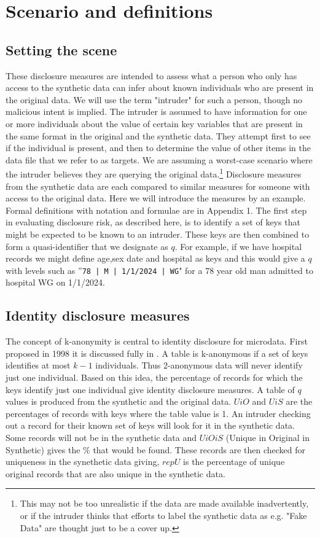 \documentclass[12pt]{article}
\begin{document}
\section{Scenario and definitions}\label{sec:sc_def_not}
\subsection{Setting the scene}\label{subsec:scen}
These disclosure measures are intended to assess what a person who only has access 
to the synthetic data can infer about known individuals who are present in the original data. We will use the term "intruder" for such a person, though no malicious intent is implied. The intruder is assumed to have information for one or more individuals about the value of certain key variables that are present in the same format in the original and the synthetic data. They attempt first to see if the individual is present, and then to determine the value of other items in the data file that we refer to as targets. We are assuming a worst-case scenario where the intruder believes 
they are querying the original data.\footnote{This may not be too unrealistic if the data are made available inadvertently, or if the intruder thinks that efforts to label the synthetic data as e.g. "Fake Data" are thought just to be a cover up.}
Disclosure measures from the synthetic data are each compared to similar measures for someone with access to the original data. Here we will introduce the measures by an example. Formal definitions with notation and formulae are in Appendix 1.
The first step in evaluating disclosure risk, as described here, is to identify a set of keys that might be expected to be known to an intruder. These keys are then combined to form a quasi-identifier that we designate as $q$. For example, if we have hospital records we might define age,sex date and hospital as keys and this would give a $q$ with levels such as ''\texttt{78 | M | 1/1/2024 | WG}" for a 78 year old man admitted to hospital WG on 1/1/2024.

\subsection{Identity disclosure measures}\label{subsec:ident} 
The concept of k-anonymity is central to identity disclosure for microdata. First proposed in 1998 \cite{kanon1} it is discussed fully in \cite{elliot_anonframe}. A table is k-anonymous if a set of keys identifies at most $k-1$ individuals. Thus 2-anonymous data will never identify just one individual. Based on this idea, the percentage of records for which the keys identify just one individual give identity disclosure measures. 
 A table of $q$ values is produced from the synthetic and the original data. $UiO$ and $UiS$ are the percentages of records with keys where the table value is 1. An intruder checking out a record for their known set of keys will look for it in the synthetic data. Some records
will not be in the synthetic data and $UiOiS$ (Unique in Original in Synthetic) gives the \% that would be found. These records are then checked for uniqueness in the
synethetic data giving, $repU$ is the percentage of unique original records that are also unique in the synthetic data.
\end{document}

